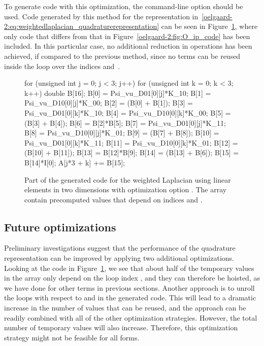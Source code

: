 To generate code with this optimization, the \ffc{}
command-line option  should
be used.  Code generated by this method for the representation
in~\eqref{oelgaard-2:eq:weightedlaplacian_quadraturerepresentation}
can be seen in Figure~\ref{oelgaard-2:fig:O_basis_code}, where only
code that differs from that in Figure~\ref{oelgaard-2:fig:O_ip_code}
has been included.  In this particular case, no additional reduction in
operations has been achieved, if compared to the previous method, since no
terms can be reused inside the loop over the indices  and~.

\begin{figure}
\begin{c++}
for (unsigned int j = 0; j < 3; j++)
{
  for (unsigned int k = 0; k < 3; k++)
  {
    double B[16];
    B[0] = Psi_vu_D01[0][j]*K_10;
    B[1] = Psi_vu_D10[0][j]*K_00;
    B[2] = (B[0] + B[1]);
    B[3] = Psi_vu_D01[0][k]*K_10;
    B[4] = Psi_vu_D10[0][k]*K_00;
    B[5] = (B[3] + B[4]);
    B[6] = B[2]*B[5];
    B[7] = Psi_vu_D01[0][j]*K_11;
    B[8] = Psi_vu_D10[0][j]*K_01;
    B[9] = (B[7] + B[8]);
    B[10] = Psi_vu_D01[0][k]*K_11;
    B[11] = Psi_vu_D10[0][k]*K_01;
    B[12] = (B[10] + B[11]);
    B[13] = B[12]*B[9];
    B[14] = (B[13] + B[6]);
    B[15] = B[14]*I[0];
    A[j*3 + k] += B[15];
  }
}
\end{c++}
\caption{Part of the generated code for the weighted Laplacian using
  linear elements in two dimensions with optimization option . The array  contain precomputed
  values that depend on indices  and .}
\label{oelgaard-2:fig:O_basis_code}
\end{figure}


\subsection{Future optimizations}

Preliminary investigations suggest that the performance of the
quadrature representation can be improved by applying two additional
optimizations.  Looking at the code in
Figure~\ref{oelgaard-2:fig:O_basis_code}, we see that about half of
the temporary values in the array  only depend on the loop
index , and they can therefore be hoisted, as we have done for
other terms in previous sections.  Another approach is to unroll the
loops with respect to  and  in the generated code.  This
will lead to a dramatic increase in the number of values that can be
reused, and the approach can be readily combined with all of the other
optimization strategies. However, the total number of temporary values
will also increase. Therefore, this optimization strategy might not be
feasible for all forms.

